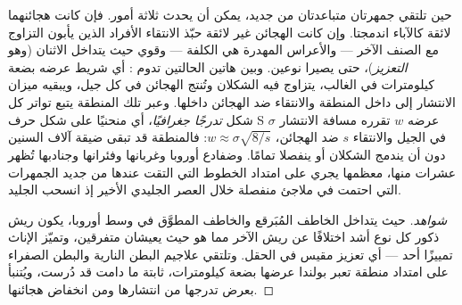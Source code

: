 \begin{proposition}\label{prop:b2:speciation:reinforcement}
حين تلتقي جمهرتان متباعدتان من جديد، يمكن أن يحدث ثلاثة أمور.
فإن كانت هجائنهما لائقة كالآباء اندمجتا. وإن كانت
الهجائن غير لائقة حبّذ الانتقاء الأفراد الذين يأبون
التزاوج مع الصنف الآخر --- والأعراس المهدرة هي الكلفة ---
وقوي  حيث يتداخل الاثنان
(وهو \emph{التعزيز})، حتى يصيرا نوعين. وبين هاتين الحالتين تدوم
\emph{}: أي شريط عرضه بضعة كيلومترات في الغالب،
يتزاوج فيه الشكلان وتُنتج الهجائن في كل
جيل، ويبقيه ميزان الانتشار إلى داخل
المنطقة والانتقاء ضد الهجائن داخلها. وعبر تلك
المنطقة يتبع تواتر كل شكل \emph{تدرجًا جغرافيًا}، أي منحنيًا
على شكل حرف S عرضه $w$ تقرره مسافة الانتشار $\sigma$ في
الجيل والانتقاء $s$ ضد الهجائن، $w \approx
\sigma\sqrt{8/s}$: فالمنطقة قد تبقى ضيقة آلاف السنين
دون أن يندمج الشكلان أو ينفصلا تمامًا. وضفادع
أوروبا وغربانها وفئرانها وجنادبها تُظهر عشرات منها، معظمها
يجري على امتداد الخطوط التي التقت عندها من جديد الجمهرات التي احتمت في
ملاجئ منفصلة خلال العصر الجليدي الأخير إذ انسحب الجليد.
\end{proposition}
\begin{proof}[شواهد]
حيث يتداخل الخاطف المُبَرقع والخاطف المطوَّق في وسط أوروبا،
يكون ريش ذكور كل نوع أشد اختلافًا عن ريش
الآخر مما هو حيث يعيشان متفرقين، وتميّز الإناث تمييزًا
أحد --- أي تعزيز مقيس في الحقل. وتلتقي علاجيم البطن النارية
والبطن الصفراء على امتداد منطقة تعبر بولندا عرضها بضعة
كيلومترات، ثابتة ما دامت قد دُرست، ويُتنبأ
بعرض تدرجها من انتشارها ومن انخفاض
 هجائنها.
\end{proof}

